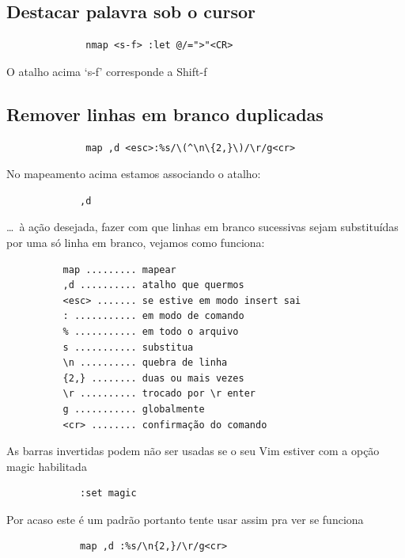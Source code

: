 \documentclass[10pt,a4paper,openany]{book}
\begin{document}
\subsection{Destacar palavra sob o cursor }
\label{Destacar palavra sob o cursor }

\begin{verbatim}
			  nmap <s-f> :let @/=">"<CR>
\end{verbatim}

O atalho acima `s-f' corresponde a Shift-f

\subsection{Remover linhas em branco duplicadas }
\label{Remover linhas em branco duplicadas }

\begin{verbatim}
			  map ,d <esc>:%s/\(^\n\{2,}\)/\r/g<cr>
\end{verbatim}

No mapeamento acima estamos associando o atalho:

\begin{verbatim}
			 ,d
\end{verbatim}

\dots~à ação desejada, fazer com que linhas em branco sucessivas sejam
substituídas por uma só linha em branco, vejamos como funciona:

\begin{verbatim}
		  map ......... mapear
		  ,d .......... atalho que quermos
		  <esc> ....... se estive em modo insert sai
		  : ........... em modo de comando
		  % ........... em todo o arquivo
		  s ........... substitua
		  \n .......... quebra de linha
		  {2,} ........ duas ou mais vezes
		  \r .......... trocado por \r enter
		  g ........... globalmente
		  <cr> ........ confirmação do comando
\end{verbatim}

As barras invertidas podem não ser usadas se o seu Vim estiver com a opção
magic habilitada

\begin{verbatim}
			 :set magic
\end{verbatim}

Por acaso este é um padrão portanto tente usar assim pra ver se funciona

\begin{verbatim}
			 map ,d :%s/\n{2,}/\r/g<cr>
\end{verbatim}
\end{document}

